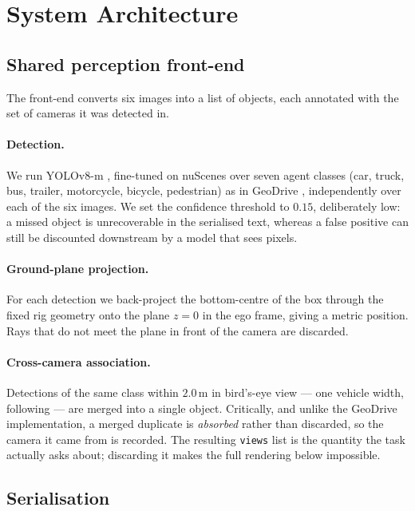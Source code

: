 \documentclass[11pt]{article}
\begin{document}
\section{System Architecture}
\label{sec:system}

\subsection{Shared perception front-end}

The front-end converts six images into a list of objects, each annotated with
the set of cameras it was detected in.

\paragraph{Detection.} We run YOLOv8-m \citep{ultralytics2023yolov8},
fine-tuned on nuScenes over seven agent classes (car, truck, bus, trailer,
motorcycle, bicycle, pedestrian) as in GeoDrive
\citep{gaafar2025geodrive}, independently over each of the six images. We set
the confidence threshold to $0.15$, deliberately low: a missed object is
unrecoverable in the serialised text, whereas a false positive can still be
discounted downstream by a model that sees pixels.

\paragraph{Ground-plane projection.} For each detection we back-project the
bottom-centre of the box through the fixed rig geometry onto the plane
$z=0$ in the ego frame, giving a metric position. Rays that do not meet the
plane in front of the camera are discarded.

\paragraph{Cross-camera association.} Detections of the same class within
$2.0$\,m in bird's-eye view --- one vehicle width, following
\citet{gaafar2025geodrive} --- are merged into a single object. Critically,
and unlike the GeoDrive implementation, a merged duplicate is \emph{absorbed}
rather than discarded, so the camera it came from is recorded. The resulting
\texttt{views} list is the quantity the task actually asks about; discarding it
makes the full rendering below impossible.

\subsection{Serialisation}
\end{document}
